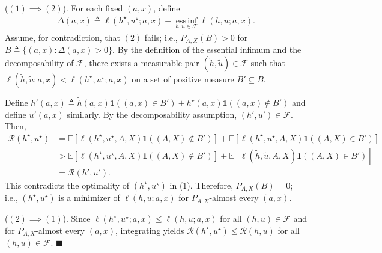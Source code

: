 ($(1) \implies (2)$). For each fixed $(a,x)$, define
\begin{align}
    \Delta(a,x) \triangleq \ell(h^{\star}, u^{\star}; a,x) - \operatorname*{ess\,inf}_{h,u \in \mathcal{F}}\ell(h,u; a,x).
\end{align}
Assume, for contradiction, that $(2)$ fails; i.e., $P_{A,X}(B) > 0$ for $B \triangleq \{(a,x): \Delta(a,x) > 0\}$. By the definition of the essential infimum and the decomposability of $\mathcal{F}$, there exists a measurable pair $(\tilde{h},\tilde{u}) \in \mathcal{F}$ such that $\ell(\tilde{h},\tilde{u}; a,x) < \ell(h^{\star}, u^{\star}; a,x)$ on a set of positive measure $B' \subseteq B$. 

Define $h'(a,x) \triangleq \tilde{h}(a,x)\boldsymbol{1}((a,x) \in B') + h^{\star}(a,x)\boldsymbol{1}((a,x) \not\in B') $ and define $u'(a,x)$ similarly. By the decomposability assumption, $(h',u') \in \mathcal{F}$. Then, 
\begin{align}
    \mathcal{R}(h^{\star},u^{\star}) &= \mathbb{E}[\ell(h^{\star},u^{\star},A,X)\boldsymbol{1}((A,X) \not \in B')] + \mathbb{E}[\ell(h^{\star},u^{\star},A,X)\boldsymbol{1}((A,X) \in B')] \\ 
    &> \mathbb{E}[\ell(h^{\star},u^{\star},A,X)\boldsymbol{1}((A,X) \not \in B')] + \mathbb{E}[\ell(\tilde{h},\tilde{u},A,X)\boldsymbol{1}((A,X) \in B')] \\ 
    &= \mathcal{R}(h', u').
\end{align}
This contradicts the optimality of $(h^{\star}, u^{\star})$ in (1). Therefore, $P_{A,X}(B) = 0$; i.e., $(h^{\star}, u^{\star})$ is a minimizer of $\ell(h, u; a,x)$ for $P_{A,X}$-almost every $(a,x)$. 


($(2) \implies (1)$). Since $\ell(h^{\star}, u^{\star}; a,x) \le \ell(h,u;a,x)$ for all $(h,u) \in \mathcal{F}$ and for $P_{A,X}$-almost every $(a,x)$, integrating yields $\mathcal{R}(h^{\star}, u^{\star}) \le \mathcal{R}(h,u)$ for all $(h,u) \in \mathcal{F}$. \hfill $\blacksquare$





